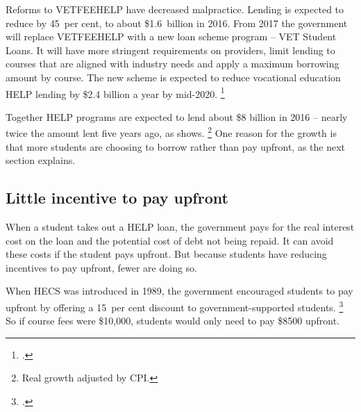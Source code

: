 \documentclass[embargoed]{grattan}
\begin{document}
Reforms to \gls{VETFEEHELP} have decreased malpractice.
Lending is expected to reduce by 45~per cent, to about \$1.6~billion in 2016.
From 2017 the government will replace \gls{VETFEEHELP} with a new loan scheme program -- VET Student Loans. It will have more stringent requirements on providers, limit lending to courses that are aligned with industry needs and apply a maximum borrowing amount by course.
The new scheme is expected to reduce vocational education \gls{HELP} lending by \$2.4 billion a year by mid-2020.%
\footnote{\textcites{Birmingham2016MediareleaseNew}.}

Together \gls{HELP} programs are expected to lend about \$8 billion in 2016 -- nearly twice the amount lent five years ago, as  shows.%
\footnote{Real growth adjusted by \gls{CPI}.} 
One reason for the growth is that more students are choosing to borrow rather than pay upfront, as the next section explains.

\subsection{Little incentive to pay upfront}\label{subsec:little-incentive-to-pay-upfront}

When a student takes out a \gls{HELP} loan, the government pays for the real interest cost on the loan and the potential cost of debt not being repaid.
It can avoid these costs if the student pays upfront. But because students have reducing incentives to pay upfront, fewer are doing so. 

When \gls{HECS} was introduced in 1989, the government encouraged students to pay upfront by offering a 15~per cent discount to government-supported students.%
\footcite[][79]{Wran1988ReportCommitteeHigher} 
So if course fees were \$10,000, students would only need to pay \$8500 upfront.
\end{document}
